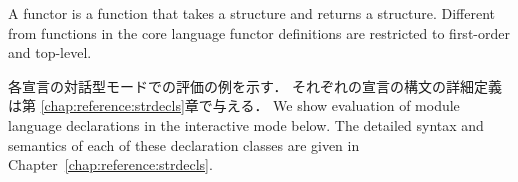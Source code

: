 \documentclass{jbook}
\begin{document}
	A functor is a function that takes a structure and returns a structure.
	Different from functions in the core language functor
definitions are restricted to first-order and top-level.
\fi%

\ifjp%
	各宣言の対話型モードでの評価の例を示す．
	それぞれの宣言の構文の詳細定義は第
\ref{chap:reference:strdecls}章で与える．
\else%
	We show evaluation of module language declarations in the
interactive mode below.
	The detailed syntax and semantics of each of these declaration
classes are given in Chapter~\ref{chap:reference:strdecls}. 
\fi%
\end{document}
